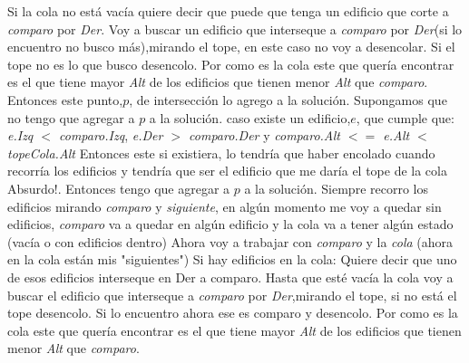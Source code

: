 \documentclass{article}
\begin{document}
        Si la cola no está vacía quiere decir que puede que tenga un edificio que corte a \textit{comparo} por \textit{Der}.
\color{red}{Grafico que corte a comparo}\color{black} \newline
                Voy a buscar un edificio que interseque a \textit{comparo} por \textit{Der}(si lo encuentro no busco más),mirando el tope, en este caso no voy a desencolar. Si el tope no es lo que busco desencolo. \newline
                Por como es la cola este que quería encontrar es el que tiene mayor \textit{Alt} de los edificios que tienen menor \textit{Alt} que \textit{comparo}.
                Entonces este punto,$p$, de intersección lo agrego a la solución.\newline
                Supongamos que no tengo que agregar a $p$ a la solución.\newline
                caso existe un edificio,$e$, que cumple que: \textit{e.Izq $<$ comparo.Izq}, \textit{e.Der $>$ comparo.Der} y \newline
                \textit{comparo.Alt $<=$ e.Alt $<$ topeCola.Alt} \newline
\color{red}{(grafico E)} \color{black} \newline          
                 Entonces este si existiera, lo tendría que haber encolado cuando recorría los edificios y tendría que ser el edificio que me daría el tope de la cola Absurdo!. Entonces tengo que agregar a $p$ a la solución.\newline
Siempre recorro los edificios mirando \textit{comparo} y \textit{siguiente}, en algún momento me voy a quedar sin edificios, \textit{comparo} va a quedar en algún edificio y la cola va a tener algún estado (vacía o con edificios dentro) \newline
\color{red}{ejemplos de estados de la cola}\color{black}\newline
Ahora voy a trabajar con \textit{comparo} y la \textit{cola} (ahora en la cola están mis "siguientes")
Si hay edificios en la cola:
Quiere decir que uno de esos edificios interseque en Der a comparo.\newline
Hasta que esté vacía la cola voy a buscar el edificio que interseque a \textit{comparo} por \textit{Der},mirando el tope, si no está el tope desencolo. Si lo encuentro ahora ese es comparo y desencolo. \newline
                Por como es la cola este que quería encontrar es el que tiene mayor \textit{Alt} de los edificios que tienen menor \textit{Alt} que \textit{comparo}.
\end{document}
